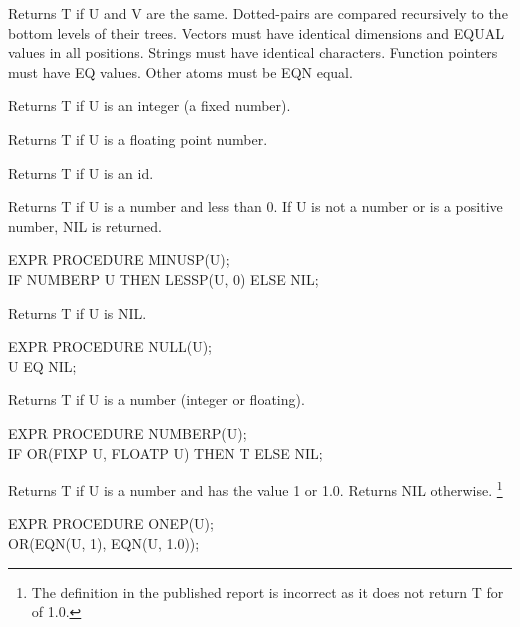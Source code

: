{Returns T if U and V are the same. Dotted-pairs are compared
recursively to the bottom levels of their trees. Vectors must have
identical dimensions and EQUAL values in all positions. Strings must
  have identical characters.
Function pointers must have EQ values. Other atoms must be EQN equal. }


{Returns T if U is an integer (a fixed number).}


{Returns T if U is a floating point number. }


{Returns T if U is an id.}


{Returns T if U is a number and less than 0.  If U is not a number or
is a positive number, NIL is returned.

{\tt \begin{tabbing} EXPR PROCEDURE MINUSP(U); \\
\hspace*{1em} IF NUMBERP U THEN LESSP(U, 0) ELSE NIL;
\end{tabbing}}}


{Returns T if U is NIL.

{\tt \begin{tabbing} EXPR PROCEDURE NULL(U); \\
\hspace*{1em} U EQ NIL;
\end{tabbing}}}


{Returns T if U is a number (integer or floating).

{\tt \begin{tabbing} EXPR PROCEDURE NUMBERP(U); \\
\hspace*{1em} IF OR(FIXP U, FLOATP U) THEN T ELSE NIL;
\end{tabbing}}}


{Returns T if U is a number and has the value 1 or 1.0.  Returns NIL
otherwise. \footnote{The definition in the published report is
incorrect as it does not return T for  of 1.0.}

{\tt \begin{tabbing} EXPR PROCEDURE ONEP(U); \\
\hspace*{1em} OR(EQN(U, 1), EQN(U, 1.0));
\end{tabbing}}}


